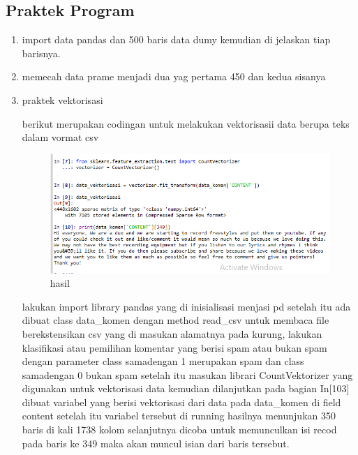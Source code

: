 \subsection{Praktek Program}
\begin{enumerate}
\item import data pandas dan 500 baris data dumy kemudian di jelaskan tiap barisnya.



\item memecah data prame menjadi dua yag pertama 450 dan kedua sisanya


\item praktek vektorisasi\par
berikut merupakan codingan untuk melakukan vektorisasii data berupa teks dalam vormat csv

\begin{figure}[ht]
\centering
\includegraphics[scale=0.5]{figures/1174002/4/ss1.PNG}
\caption{hasil}
\label{Praktek no 3}
\end{figure}
lakukan import library pandas yang di inisialisasi menjasi pd setelah itu ada dibuat class data\_komen dengan method read\_csv untuk membaca file berekstensikan csv yang di masukan alamatnya pada kurung, lakukan klasifikasi atau pemilihan komentar yang berisi spam atau bukan spam dengan parameter class samadengan 1 merupakan spam dan class samadengan 0 bukan spam setelah itu masukan librari CountVektorizer yang digunakan untuk vektorisasi data kemudian dilanjutkan pada bagian In[103] dibuat variabel yang berisi vektorisasi dari data pada data\_komen di field content setelah itu variabel tersebut di running hasilnya menunjukan 350 baris di kali 1738 kolom selanjutnya dicoba untuk memunculkan isi recod pada baris ke 349 maka akan muncul isian dari baris tersebut. 


\end{enumerate}
